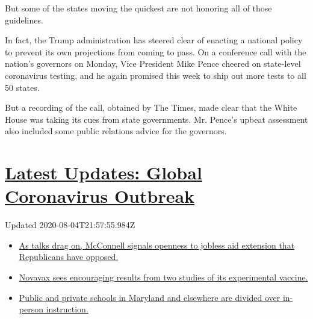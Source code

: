 But some of the states moving the quickest are not honoring all of those
guidelines.

In fact, the Trump administration has steered clear of enacting a
national policy to prevent its own projections from coming to pass. On a
conference call with the nation's governors on Monday, Vice President
Mike Pence cheered on state-level coronavirus testing, and he again
promised this week to ship out more tests to all 50 states.

But a recording of the call, obtained by The Times, made clear that the
White House was taking its cues from state governments. Mr. Pence's
upbeat assessment also included some public relations advice for the
governors.

\hypertarget{latest-updates-global-coronavirus-outbreak}{%
\section{\texorpdfstring{\href{https://www.nytimes3xbfgragh.onion/2020/08/04/world/coronavirus-cases.html?action=click\&pgtype=Article\&state=default\&region=MAIN_CONTENT_1\&context=storylines_live_updates}{Latest
Updates: Global Coronavirus
Outbreak}}{Latest Updates: Global Coronavirus Outbreak}}\label{latest-updates-global-coronavirus-outbreak}}

Updated 2020-08-04T21:57:55.984Z

\begin{itemize}
\tightlist
\item
  \href{https://www.nytimes3xbfgragh.onion/2020/08/04/world/coronavirus-cases.html?action=click\&pgtype=Article\&state=default\&region=MAIN_CONTENT_1\&context=storylines_live_updates\#link-2daa96b5}{As
  talks drag on, McConnell signals openness to jobless aid extension
  that Republicans have opposed.}
\item
  \href{https://www.nytimes3xbfgragh.onion/2020/08/04/world/coronavirus-cases.html?action=click\&pgtype=Article\&state=default\&region=MAIN_CONTENT_1\&context=storylines_live_updates\#link-1228a480}{Novavax
  sees encouraging results from two studies of its experimental
  vaccine.}
\item
  \href{https://www.nytimes3xbfgragh.onion/2020/08/04/world/coronavirus-cases.html?action=click\&pgtype=Article\&state=default\&region=MAIN_CONTENT_1\&context=storylines_live_updates\#link-4825b93}{Public
  and private schools in Maryland and elsewhere are divided over
  in-person instruction.}
\end{itemize}

